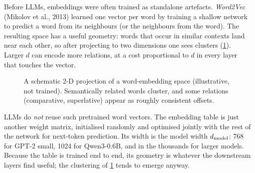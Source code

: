 Before LLMs, embeddings were often trained as standalone artefacts. \emph{Word2Vec}
(Mikolov et al., 2013) learned one vector per word by training a shallow network to predict a
word from its neighbours (or the neighbours from the word). The resulting space has a useful
geometry: words that occur in similar contexts land near each other, so after projecting to two
dimensions one sees clusters (\cref{fig:text:embspace}). Larger $d$ can encode more relations,
at a cost proportional to $d$ in every layer that touches the vector.

\begin{figure}[t]
\centering
{}
\caption{A schematic 2-D projection of a word-embedding space (illustrative, not trained).
Semantically related words cluster, and some relations (comparative, superlative) appear as
roughly consistent offsets.}
\label{fig:text:embspace}
\end{figure}

LLMs do \emph{not} reuse such pretrained word vectors. The embedding table is just another weight
matrix, initialised randomly and optimised jointly with the rest of the network for next-token
prediction. Its width is the model width $d_{\text{model}}$: 768 for GPT-2 small, 1024 for Qwen3-0.6B, and
in the thousands for larger models. Because the table is trained end to end, its geometry is
whatever the downstream layers find useful; the clustering of \cref{fig:text:embspace} tends to
emerge anyway.

